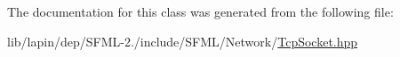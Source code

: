 The documentation for this class was generated from the following file\-:\begin{DoxyCompactItemize}
\item 
lib/lapin/dep/\-S\-F\-M\-L-\/2./include/\-S\-F\-M\-L/\-Network/\hyperlink{lapin_2dep_2_s_f_m_l-2_83_2include_2_s_f_m_l_2_network_2_tcp_socket_8hpp}{Tcp\-Socket.\-hpp}\end{DoxyCompactItemize}
